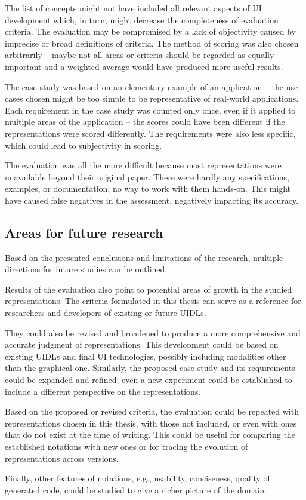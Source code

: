 The list of concepts might not have included all relevant aspects of UI development which, in turn, might decrease the completeness of evaluation criteria.
The evaluation may be compromised by a lack of objectivity caused by imprecise or broad definitions of criteria.
The method of scoring was also chosen arbitrarily -- maybe not all areas or criteria should be regarded as equally important and a weighted average would have produced more useful results.

The case study was based on an elementary example of an application -- the use cases chosen might be too simple to be representative of real-world applications.
Each requirement in the case study was counted only once, even if it applied to multiple areas of the application -- the scores could have been different if the representations were scored differently.
The requirements were also less specific, which could lead to subjectivity in scoring.

The evaluation was all the more difficult because most representations were unavailable beyond their original paper.
There were hardly any specifications, examples, or documentation; no way to work with them hands-on.
This might have caused false negatives in the assessment, negatively impacting its accuracy.

\subsection{Areas for future research}\label{subsec:areas-for-future-research}

Based on the presented conclusions and limitations of the research, multiple directions for future studies can be outlined.

Results of the evaluation also point to potential areas of growth in the studied representations.
The criteria formulated in this thesis can serve as a reference for researchers and developers of existing or future UIDLs.

They could also be revised and broadened to produce a more comprehensive and accurate judgment of representations.
This development could be based on existing UIDLs and final UI technologies, possibly including modalities other than the graphical one.
Similarly, the proposed case study and its requirements could be expanded and refined; even a new experiment could be established to include a different perspective on the representations.

Based on the proposed or revised criteria, the evaluation could be repeated with representations chosen in this thesis, with those not included, or even with ones that do not exist at the time of writing.
This could be useful for comparing the established notations with new ones or for tracing the evolution of representations across versions.

Finally, other features of notations, e.g., usability, conciseness, quality of generated code, could be studied to give a richer picture of the domain.
